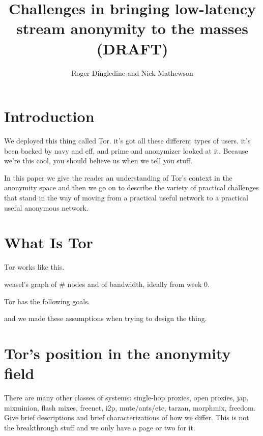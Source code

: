 \documentclass{llncs}
\begin{document}
\title{Challenges in bringing low-latency stream anonymity to the masses (DRAFT)}

\author{Roger Dingledine and Nick Mathewson}

\section{Introduction}

We deployed this thing called Tor. it's got all these different types of
users. it's been backed by navy and eff, and prime and anonymizer looked at
it. Because we're this cool, you should believe us when we tell you stuff.

In this paper we give the reader an understanding of Tor's context
in the anonymity space and then we go on to describe the variety of
practical challenges that stand in the way of moving from a practical
useful network to a practical useful anonymous network.


\section{What Is Tor}

Tor works like this.

weasel's graph of \# nodes and of bandwidth, ideally from week 0.

Tor has the following goals.

and we made these assumptions when trying to design the thing.

\section{Tor's position in the anonymity field}

There are many other classes of systems: single-hop proxies, open proxies,
jap, mixminion, flash mixes, freenet, i2p, mute/ants/etc, tarzan,
morphmix, freedom. Give brief descriptions and brief characterizations
of how we differ. This is not the breakthrough stuff and we only have
a page or two for it.
\end{document}
